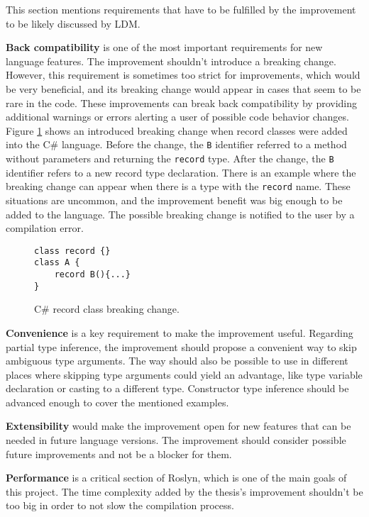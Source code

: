 This section mentions requirements that have to be fulfilled by the improvement to be likely discussed by \ac{LDM}.
\par
{}
\textbf{Back compatibility} is one of the most important requirements for new language features. 
The improvement shouldn’t introduce a breaking change. However, this requirement is sometimes too strict for improvements, which would be very beneficial, and its breaking change would appear in cases that seem to be rare in the code. 
These improvements can break back compatibility by providing additional warnings or errors alerting a user of possible code behavior changes.
Figure \ref{img39:brkCh} shows an introduced breaking change when record classes were added into the C\# language. 
Before the change, the \texttt{B} identifier referred to a method without parameters and returning the \texttt{record} type. 
After the change, the \texttt{B} identifier refers to a new record type declaration. 
There is an example where the breaking change can appear when there is a type with the \texttt{record} name. 
These situations are uncommon, and the improvement benefit was big enough to be added to the language. 
The possible breaking change is notified to the user by a compilation error.
\begin{figure}[h]
\begin{lstlisting}[style=csharp]
class record {}
class A {
    record B(){...}
}
\end{lstlisting}
\caption{C\# record class breaking change.}
\label{img39:brkCh}
\end{figure}
\par
{}
\textbf{Convenience} is a key requirement to make the improvement useful. 
Regarding partial type inference, the improvement should propose a convenient way to skip ambiguous type arguments. 
The way should also be possible to use in different places where skipping type arguments could yield an advantage, like type variable declaration or casting to a different type. 
Constructor type inference should be advanced enough to cover the mentioned examples.
\par
{}
\textbf{Extensibility} would make the improvement open for new features that can be needed in future language versions. 
The improvement should consider possible future improvements and not be a blocker for them.
\par
{}
\textbf{Performance} is a critical section of Roslyn, which is one of the main goals of this project.
The time complexity added by the thesis’s improvement shouldn’t be too big in order to not slow the compilation process.

